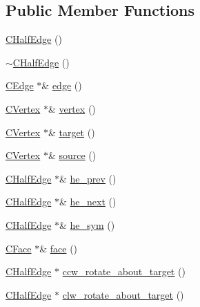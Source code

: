 \subsection*{Public Member Functions}
\begin{DoxyCompactItemize}
\item 
\hyperlink{class_mesh_lib_1_1_c_half_edge_a9378ce34e4a19f08367911e64cd51e2d}{C\+Half\+Edge} ()
\item 
\hyperlink{class_mesh_lib_1_1_c_half_edge_a0e01e2c85afed1b7f58ecc45ee33e64f}{$\sim$\+C\+Half\+Edge} ()
\item 
\hyperlink{class_mesh_lib_1_1_c_edge}{C\+Edge} $\ast$\& \hyperlink{class_mesh_lib_1_1_c_half_edge_aa1724d1db29cd8757d5dee1d8153d684}{edge} ()
\item 
\hyperlink{class_mesh_lib_1_1_c_vertex}{C\+Vertex} $\ast$\& \hyperlink{class_mesh_lib_1_1_c_half_edge_a2063aaf2df1381ad2039fc439b6678a1}{vertex} ()
\item 
\hyperlink{class_mesh_lib_1_1_c_vertex}{C\+Vertex} $\ast$\& \hyperlink{class_mesh_lib_1_1_c_half_edge_a9485327b098c302b75b3174e7b089801}{target} ()
\item 
\hyperlink{class_mesh_lib_1_1_c_vertex}{C\+Vertex} $\ast$\& \hyperlink{class_mesh_lib_1_1_c_half_edge_a2948966fdbf42dd49dcb60db403d1d03}{source} ()
\item 
\hyperlink{class_mesh_lib_1_1_c_half_edge}{C\+Half\+Edge} $\ast$\& \hyperlink{class_mesh_lib_1_1_c_half_edge_a5b7e36ee2a8cf9429db2f245e1d37237}{he\+\_\+prev} ()
\item 
\hyperlink{class_mesh_lib_1_1_c_half_edge}{C\+Half\+Edge} $\ast$\& \hyperlink{class_mesh_lib_1_1_c_half_edge_afc73f6f23ef785403da61e77cf2d5ec7}{he\+\_\+next} ()
\item 
\hyperlink{class_mesh_lib_1_1_c_half_edge}{C\+Half\+Edge} $\ast$\& \hyperlink{class_mesh_lib_1_1_c_half_edge_a8498e670fe320824da2bd396c0467daa}{he\+\_\+sym} ()
\item 
\hyperlink{class_mesh_lib_1_1_c_face}{C\+Face} $\ast$\& \hyperlink{class_mesh_lib_1_1_c_half_edge_a3e959e63211e72cf1b78d58f644ef723}{face} ()
\item 
\hyperlink{class_mesh_lib_1_1_c_half_edge}{C\+Half\+Edge} $\ast$ \hyperlink{class_mesh_lib_1_1_c_half_edge_ab8c6cc91d89cd5f52ab9ef8202af1e90}{ccw\+\_\+rotate\+\_\+about\+\_\+target} ()
\item 
\hyperlink{class_mesh_lib_1_1_c_half_edge}{C\+Half\+Edge} $\ast$ \hyperlink{class_mesh_lib_1_1_c_half_edge_a82da051b8bdb4ebfd891ddf16e48049c}{clw\+\_\+rotate\+\_\+about\+\_\+target} ()

\end{DoxyCompactItemize}
